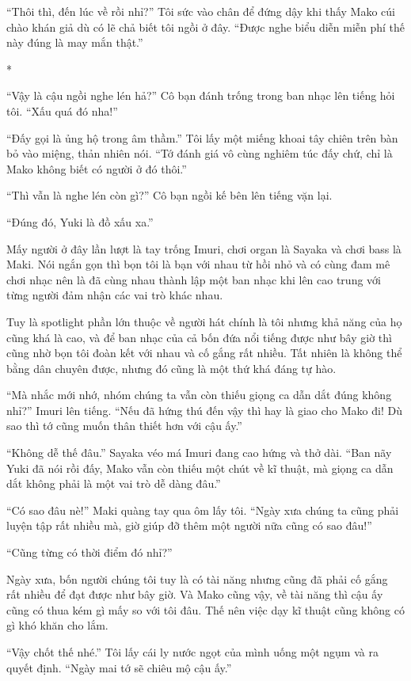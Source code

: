 {``Thôi thì, đến lúc về rồi nhỉ?'' Tôi sức vào chân để đứng dậy khi thấy
Mako cúi chào khán giả dù có lẽ chả biết tôi ngồi ở đây. ``Được nghe
biểu diễn miễn phí thế này đúng là may mắn thật.''

*

``Vậy là cậu ngồi nghe lén hả?'' Cô bạn đánh trống trong ban nhạc lên
tiếng hỏi tôi. ``Xấu quá đó nha!''

``Đấy gọi là ủng hộ trong âm thầm.'' Tôi lấy một miếng khoai tây chiên
trên bàn bỏ vào miệng, thản nhiên nói. ``Tớ đánh giá vô cùng nghiêm túc
đấy chứ, chỉ là Mako không biết có người ở đó thôi.''

``Thì vẫn là nghe lén còn gì?'' Cô bạn ngồi kế bên lên tiếng vặn lại.

``Đúng đó, Yuki là đồ xấu xa.''

Mấy người ở đây lần lượt là tay trống Imuri, chơi organ là Sayaka và
chơi bass là Maki. Nói ngắn gọn thì bọn tôi là bạn với nhau từ hồi nhỏ
và có cùng đam mê chơi nhạc nên là đã cùng nhau thành lập một ban nhạc
khi lên cao trung với từng người đảm nhận các vai trò khác nhau.

Tuy là spotlight phần lớn thuộc về người hát chính là tôi nhưng khả năng
của họ cũng khá là cao, và để ban nhạc của cả bốn đứa nổi tiếng được như
bây giờ thì cũng nhờ bọn tôi đoàn kết với nhau và cố gắng rất nhiều. Tất
nhiên là không thể bằng dân chuyên được, nhưng đó cũng là một thứ khá
đáng tự hào.

``Mà nhắc mới nhớ, nhóm chúng ta vẫn còn thiếu giọng ca dẫn dắt đúng
không nhỉ?'' Imuri lên tiếng. ``Nếu đã hứng thú đến vậy thì hay là giao
cho Mako đi! Dù sao thì tớ cũng muốn thân thiết hơn với cậu ấy.''

``Không dễ thế đâu.'' Sayaka véo má Imuri đang cao hứng và thở dài.
``Ban nãy Yuki đã nói rồi đấy, Mako vẫn còn thiếu một chút về kĩ thuật,
mà giọng ca dẫn dắt không phải là một vai trò dễ dàng đâu.''

``Có sao đâu nè!'' Maki quàng tay qua ôm lấy tôi. ``Ngày xưa chúng ta
cũng phải luyện tập rất nhiều mà, giờ giúp đỡ thêm một người nữa cũng có
sao đâu!''

``Cũng từng có thời điểm đó nhỉ?''

Ngày xưa, bốn người chúng tôi tuy là có tài năng nhưng cũng đã phải cố
gắng rất nhiều để đạt được như bây giờ. Và Mako cũng vậy, về tài năng
thì cậu ấy cũng có thua kém gì mấy so với tôi đâu. Thế nên việc dạy kĩ
thuật cũng không có gì khó khăn cho lắm.

``Vậy chốt thế nhé.'' Tôi lấy cái ly nước ngọt của mình uống một ngụm và
ra quyết định. ``Ngày mai tớ sẽ chiêu mộ cậu ấy.''

}

